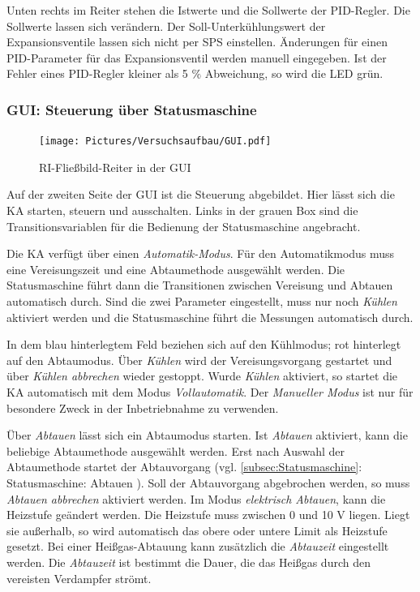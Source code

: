Unten rechts im Reiter stehen die Istwerte und die Sollwerte der PID-Regler. Die Sollwerte lassen sich verändern. Der Soll-Unterkühlungswert der Expansionsventile lassen sich nicht per SPS einstellen. Änderungen für einen PID-Parameter für das Expansionsventil werden manuell eingegeben. Ist der Fehler eines PID-Regler kleiner als 5 $\%$ Abweichung, so wird die LED grün.     


\subsubsection*{GUI: Steuerung über Statusmaschine}

\begin{figure}[htb]
\centering		\texttt{[image: Pictures/Versuchsaufbau/GUI.pdf]}
\caption{RI-Fließbild-Reiter in der GUI}
\label{fig:RI}
\end{figure}

Auf der zweiten Seite der GUI ist die Steuerung abgebildet. Hier lässt sich die KA starten, steuern und ausschalten. Links in der grauen Box sind die Transitionsvariablen für die Bedienung der Statusmaschine angebracht. 

Die KA verfügt über einen \textit{Automatik-Modus}. Für den Automatikmodus muss eine Vereisungszeit und eine Abtaumethode ausgewählt werden. Die Statusmaschine führt dann die Transitionen zwischen Vereisung und Abtauen automatisch durch. Sind die zwei Parameter eingestellt, muss nur noch \textit{Kühlen} aktiviert werden und die Statusmaschine führt die Messungen automatisch durch. 

In dem blau hinterlegtem Feld beziehen sich auf den Kühlmodus; rot hinterlegt auf den Abtaumodus. Über \textit{Kühlen} wird der Vereisungsvorgang gestartet und über \textit{Kühlen abbrechen} wieder gestoppt. Wurde \textit{Kühlen} aktiviert, so startet die KA automatisch mit dem Modus \textit{Vollautomatik}. Der \textit{Manueller Modus} ist nur für besondere Zweck in der Inbetriebnahme zu verwenden.

Über \textit{Abtauen} lässt sich ein Abtaumodus starten. Ist \textit{Abtauen} aktiviert, kann die beliebige Abtaumethode ausgewählt werden. Erst nach Auswahl der Abtaumethode startet der Abtauvorgang (vgl. \ref{subsec:Statusmaschine}: Statusmaschine: Abtauen ). Soll der Abtauvorgang abgebrochen werden, so muss \textit{Abtauen abbrechen} aktiviert werden. Im Modus \textit{elektrisch Abtauen}, kann die Heizstufe geändert werden. Die Heizstufe muss zwischen 0 und 10 V liegen. Liegt sie außerhalb, so wird automatisch das obere oder untere Limit als Heizstufe gesetzt. Bei einer Heißgas-Abtauung kann zusätzlich die \textit{Abtauzeit} eingestellt werden. Die \textit{Abtauzeit} ist bestimmt die Dauer, die das Heißgas durch den vereisten Verdampfer strömt.  

